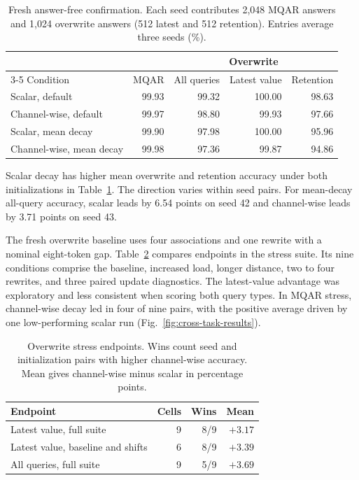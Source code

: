 \documentclass[conference]{IEEEtran}
\begin{document}
\begin{table}[t]
\caption{Fresh answer-free confirmation. Each seed contributes 2,048 MQAR answers and 1,024 overwrite answers (512 latest and 512 retention). Entries average three seeds (\%).}
\label{tab:confirmation}
\centering
\scriptsize
\setlength{\tabcolsep}{3pt}
\begin{tabular}{lrrrr}
\toprule
 & & \multicolumn{3}{c}{Overwrite} \\
\cmidrule(l){3-5}
Condition & MQAR & All queries & Latest value & Retention \\
\midrule
Scalar, default & 99.93 & 99.32 & 100.00 & 98.63 \\
Channel-wise, default & 99.97 & 98.80 & 99.93 & 97.66 \\
Scalar, mean decay & 99.90 & 97.98 & 100.00 & 95.96 \\
Channel-wise, mean decay & 99.98 & 97.36 & 99.87 & 94.86 \\
\bottomrule
\end{tabular}
\end{table}

Scalar decay has higher mean overwrite and retention accuracy under both initializations in Table~\ref{tab:confirmation}. The direction varies within seed pairs. For mean-decay all-query accuracy, scalar leads by 6.54 points on seed 42 and channel-wise leads by 3.71 points on seed 43.

The fresh overwrite baseline uses four associations and one rewrite with a nominal eight-token gap. Table~\ref{tab:stress-endpoint} compares endpoints in the stress suite. Its nine conditions comprise the baseline, increased load, longer distance, two to four rewrites, and three paired update diagnostics. The latest-value advantage was exploratory and less consistent when scoring both query types. In MQAR stress, channel-wise decay led in four of nine pairs, with the positive average driven by one low-performing scalar run (Fig.~\ref{fig:cross-task-results}).

\begin{table}[t]
\caption{Overwrite stress endpoints. Wins count seed and initialization pairs with higher channel-wise accuracy. Mean gives channel-wise minus scalar in percentage points.}
\label{tab:stress-endpoint}
\centering
\small
\setlength{\tabcolsep}{4pt}
\begin{tabular}{lrrr}
\toprule
Endpoint & Cells & Wins & Mean \\
\midrule
Latest value, full suite & 9 & 8/9 & $+3.17$ \\
Latest value, baseline and shifts & 6 & 8/9 & $+3.39$ \\
All queries, full suite & 9 & 5/9 & $+3.69$ \\
\bottomrule
\end{tabular}
\end{table}
\end{document}
